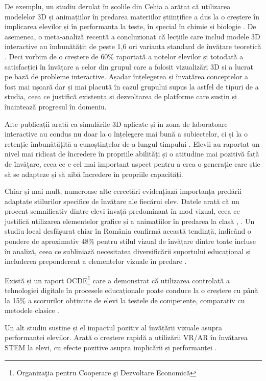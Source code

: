 De exemplu, un studiu derulat în școlile din Cehia a arătat că utilizarea modelelor 3D și animațiilor în predarea
materiilor științifice a dus la o creștere în implicarea elevilor și în performanța la teste,
în special în chimie și biologie \cite{study1}. De asemenea, o meta-analiză recentă a concluzionat că lecțiile
care includ modele 3D interactive au îmbunătățit de peste 1,6 ori varianta standard de învățare teoretică \cite{study4}.
Deci vorbim de o creștere de 60\% raportată a notelor elevilor și totodată a satisfacției în învățare a celor din grupul care a folosit vizualizări 3D si
a lucrat pe bază de probleme interactive. Așadar înțelegerea și învațărea
conceptelor a fost mai ușoară dar și mai placută în cazul grupului supus la astfel de tipuri de a studia,
ceea ce justifică existența și dezvoltarea de platforme care susțin și înaintează progresul în domeniu.

Alte publicații arată ca simulările 3D aplicate și în zona de laboratoare interactive au condus nu doar la o înțelegere mai bună a subiectelor,
ci și la o retenție îmbunătățită a cunoștințelor de-a lungul timpului \cite{study5}. Elevii au raportat un nivel mai ridicat
de încredere în propriile abilități și o atitudine mai pozitivă față de învățare, ceea ce e cel mai important aspect
pentru a crea o generație care știe să se adapteze și să aibă încredere în propriile capacități.

Chiar și mai mult, numeroase alte cercetări evidențiază importanța predării adaptate stilurilor specifice de învățare ale
fiecărui elev. Datele arată că un procent semnificativ dintre elevi învață predominant în mod vizual, ceea ce
justifică utilizarea elementelor grafice și a animațiilor în predarea la clasă \cite{study2}, \cite{study3}. 
Un studiu local desfășurat chiar în România confirmă această tendință, indicând o pondere
de aproximativ 48\% pentru stilul vizual de învățare dintre toate incluse în analiză, ceea ce subliniază
necesitatea diversificării suportului educațional și includerea preponderent a elementelor vizuale în predare \cite{study2}.

Există și un raport OCDE\footnote{Organizaţia pentru Cooperare şi Dezvoltare Economică} care a demonstrat că utilizarea 
controlată a tehnologiei digitale în procesele educaționale poate conduce la o creștere cu până la 15\% a
scorurilor obținute de elevi la testele de competențe, comparativ cu metodele clasice \cite{study7}.

Un alt studiu susține și el impactul pozitiv al învățării vizuale asupra performanței elevilor. 
Arată o creștere rapidă a utilizării VR/AR în învățarea STEM la elevi,
cu efecte pozitive asupra implicării și performanței \cite{study9}.

